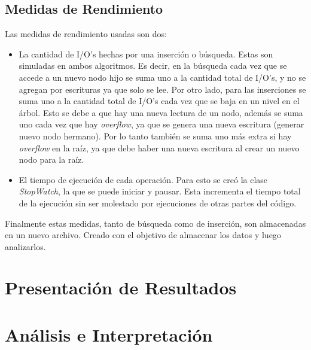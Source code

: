 \documentclass[letterpaper,12pt]{article}
\begin{document}
\subsection{Medidas de Rendimiento}
Las medidas de rendimiento usadas son dos:
\begin{itemize}
\item La cantidad de I/O's hechas por una inserci\'on o b\'usqueda. Estas son simuladas en ambos algoritmos. Es decir, en la b\'usqueda cada vez que se accede a un nuevo nodo hijo se suma uno a la cantidad total de I/O's, y no se agregan por escrituras ya que solo se lee. Por otro lado, para las inserciones se suma uno a la cantidad total de I/O's cada vez que se baja en un nivel en el \'arbol. Esto se debe a que hay una nueva lectura de un nodo, adem\'as se suma uno cada vez que hay \textit{overflow}, ya que se genera una nueva escritura (generar nuevo nodo hermano). Por lo tanto tambi\'en se suma uno m\'as extra si hay \textit{overflow} en la ra\'iz, ya que debe haber una nueva escritura al crear un nuevo nodo para la ra\'iz.

\item El tiempo de ejecuci\'on de cada operaci\'on. Para esto se cre\'o la clase \textit{StopWatch}, la que se puede iniciar y pausar. Esta incrementa el tiempo total de la ejecución sin ser molestado por ejecuciones de otras partes del c\'odigo.
\end{itemize}
Finalmente estas medidas, tanto de b\'usqueda como de inserci\'on, son almacenadas en un nuevo archivo. Creado con el objetivo de almacenar los datos y luego analizarlos.
\newpage
\section{Presentaci\'on de Resultados}


\newpage
\section{An\'alisis e Interpretaci\'on}
 
 
 
 
 
 
\end{document}
